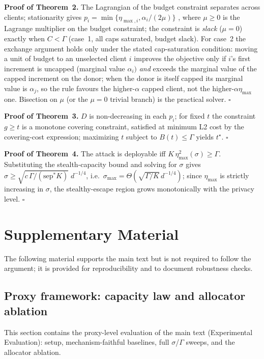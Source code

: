 \documentclass[final,1p,times]{elsarticle}
\begin{document}
\textbf{Proof of Theorem~2.} The Lagrangian of
the budget constraint separates across clients; stationarity gives
$p_i=\min\{\eta_{\max,i},\alpha_i/(2\mu)\}$ \cite{boyd2004convex}, where
$\mu\ge0$ is the Lagrange multiplier on the budget constraint; the
constraint is \emph{slack} ($\mu{=}0$) exactly when $C<\Gamma$ (case~1, all
caps saturated, budget slack). For case~2 the exchange argument holds
only under the stated cap-saturation condition: moving a unit of
budget to an unselected client $i$ improves the objective only if
$i$'s first increment is uncapped (marginal value $\alpha_i)$
\emph{and} exceeds the marginal value of the capped increment on the
donor; when the donor is itself capped its marginal value is
$\alpha_j$, so the rule favours the higher-$\alpha$ capped client, not
the higher-$\alpha\eta_{\max}$ one. Bisection on $\mu$ (or the
$\mu{=}0$ trivial branch) is the practical solver. \hfill$\square$

\textbf{Proof of Theorem~3.} $D$ is non-decreasing in
each $p_i$; for fixed $t$ the constraint $g\ge t$ is a monotone
covering constraint, satisfied at minimum L2 cost by
the covering-cost expression; maximizing $t$ subject to $B(t)\le\Gamma$ yields
$t^\star$. \hfill$\square$

\textbf{Proof of Theorem~4.} The attack is deployable iff
$K\,\eta_{\max}^2(\sigma)\ge\Gamma$. Substituting the stealth-capacity bound
and solving for $\sigma$ gives
$\sigma\ge\sqrt{c\,\Gamma/(\mathrm{sep}^{*}K)}\;d^{-1/4}$, i.e.\
$\sigma_{\max}=\Theta(\sqrt{\Gamma/K}\,d^{-1/4})$; since
$\eta_{\max}$ is strictly increasing in $\sigma$, the stealthy-escape
region grows monotonically with the privacy level. \hfill$\square$

\section*{Supplementary Material}
The following material supports the main text but is not required to
follow the argument; it is provided for reproducibility and to document
robustness checks.

\subsection{Proxy framework: capacity law and allocator
ablation}\label{supp:proxy}
This section contains the proxy-level evaluation of the main text
(Experimental Evaluation): setup, mechanism-faithful baselines, full
$\sigma$/$\Gamma$ sweeps, and the allocator ablation.
\end{document}
